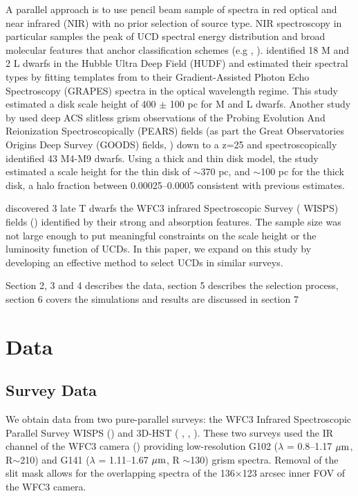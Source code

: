 \documentclass[manuscript]{aastex}
\begin{document}
A parallel approach is to use pencil beam sample of spectra in red optical and near infrared (NIR) with no prior selection of source type. NIR spectroscopy in particular samples the peak of UCD spectral energy distribution and broad molecular features that anchor classification schemes (e.g \citealt{2005ARA&A..43..195K}, \citealt{2006ApJ...637.1067B}). \citet{2005ApJ...622..319P} identified 18 M and 2 L dwarfs in the Hubble Ultra Deep Field (HUDF) and estimated their spectral types by fitting templates from \citet{Kirkpatrick2000} to their Gradient-Assisted Photon Echo Spectroscopy (GRAPES) spectra in the optical wavelength regime. This study estimated a disk scale height of 400 $\pm$ 100 pc for M and L dwarfs. Another study by \citet{2009ApJ...695.1591P} used deep ACS slitless grism observations of the Probing Evolution And Reionization Spectroscopically (PEARS) fields (as part the Great Observatories Origins Deep Survey (GOODS) fields, \citealt{Giavalisco2004}) down to a z=25 and spectroscopically identified 43 M4-M9 dwarfs. Using a thick and thin disk model, the study estimated a scale height for the thin disk of  $\sim$370 pc, and $\sim$100 pc  for the thick disk, a halo fraction between 0.00025--0.0005 consistent with previous estimates. 

\citealt{2012ApJ...752L..14M} discovered 3 late T dwarfs the WFC3 infrared Spectroscopic Survey ( WISPS) fields (\citealt{2010ApJ...723..104A}) identified by their strong \meth and \wat absorption features. The sample size was not large enough to put meaningful constraints on the scale height or the luminosity function of UCDs. In this paper, we expand on this study by developing an effective method to select UCDs in similar surveys.

Section 2, 3 and 4 describes the data, section 5 describes the selection process, section 6 covers the simulations and results are discussed in section 7


\section{Data}
\subsection{Survey Data}

We obtain data from two pure-parallel surveys: the WFC3 Infrared Spectroscopic Parallel Survey WISPS (\citealt{2010ApJ...723..104A}) and 3D-HST ( \citealt{Momcheva2016}, \citealt{2012ApJS..200...13B}, \citealt{Skelton2014}). These two surveys used the IR channel of the WFC3 camera (\citealt{doi:10.1117/12.789581}) providing low-resolution G102 ($\lambda$ = 0.8--1.17 $\mbox{$\mu$m}$, R$\sim$210) and G141 ($\lambda$ = 1.11--1.67  $\mbox{$\mu$m}$, R $\sim$130) grism spectra. Removal of the slit mask allows for the overlapping spectra of the 136$\times$123 arcsec inner FOV of the WFC3 camera.
\end{document}
